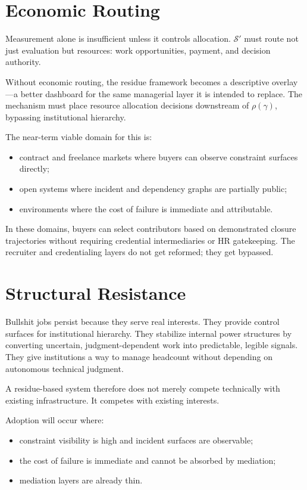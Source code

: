 \documentclass[12pt]{article}
\begin{document}
\section{Economic Routing}

Measurement alone is insufficient unless it controls allocation.
$\mathcal{S}'$ must route not just evaluation but resources: work
opportunities, payment, and decision authority.

Without economic routing, the residue framework becomes a descriptive
overlay---a better dashboard for the same managerial layer it is
intended to replace. The mechanism must place resource allocation
decisions downstream of $\rho(\gamma)$, bypassing institutional
hierarchy.

The near-term viable domain for this is:
\begin{itemize}
  \item contract and freelance markets where buyers can observe
    constraint surfaces directly;
  \item open systems where incident and dependency graphs are partially
    public;
  \item environments where the cost of failure is immediate and
    attributable.
\end{itemize}

In these domains, buyers can select contributors based on demonstrated
closure trajectories without requiring credential intermediaries or HR
gatekeeping. The recruiter and credentialing layers do not get reformed;
they get bypassed.

\section{Structural Resistance}

Bullshit jobs persist because they serve real interests. They provide
control surfaces for institutional hierarchy. They stabilize internal
power structures by converting uncertain, judgment-dependent work into
predictable, legible signals. They give institutions a way to manage
headcount without depending on autonomous technical judgment.

A residue-based system therefore does not merely compete technically
with existing infrastructure. It competes with existing interests.

Adoption will occur where:
\begin{itemize}
  \item constraint visibility is high and incident surfaces are
    observable;
  \item the cost of failure is immediate and cannot be absorbed by
    mediation;
  \item mediation layers are already thin.
\end{itemize}
\end{document}
